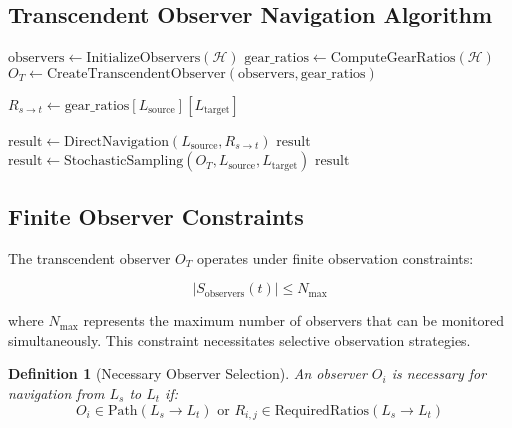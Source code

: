 \documentclass[12pt,a4paper]{article}
\newtheorem{definition}{Definition}
\begin{document}
\subsection{Transcendent Observer Navigation Algorithm}

\begin{algorithm}[H]
\caption{Transcendent Observer Navigation}
\label{alg:transcendent_navigation}
\begin{algorithmic}[1]
    \State $\text{observers} \gets \text{InitializeObservers}(\mathcal{H})$
    \State $\text{gear\_ratios} \gets \text{ComputeGearRatios}(\mathcal{H})$
    \State $O_T \gets \text{CreateTranscendentObserver}(\text{observers}, \text{gear\_ratios})$

    \State $R_{s \to t} \gets \text{gear\_ratios}[L_{\text{source}}][L_{\text{target}}]$

        \State $\text{result} \gets \text{DirectNavigation}(L_{\text{source}}, R_{s \to t})$
        \State \Return $\text{result}$
    \Else
        \State $\text{result} \gets \text{StochasticSampling}(O_T, L_{\text{source}}, L_{\text{target}})$
        \State \Return $\text{result}$
    \EndIf
\EndProcedure
\end{algorithmic}
\end{algorithm}

\subsection{Finite Observer Constraints}

The transcendent observer $O_T$ operates under finite observation constraints:

\begin{equation}
|S_{\text{observers}}(t)| \leq N_{\text{max}}
\end{equation}

where $N_{\text{max}}$ represents the maximum number of observers that can be monitored simultaneously. This constraint necessitates selective observation strategies.

\begin{definition}[Necessary Observer Selection]
An observer $O_i$ is necessary for navigation from $L_s$ to $L_t$ if:
\begin{equation}
O_i \in \text{Path}(L_s \to L_t) \text{ or } R_{i,j} \in \text{RequiredRatios}(L_s \to L_t)
\end{equation}
\end{definition}
\end{document}
